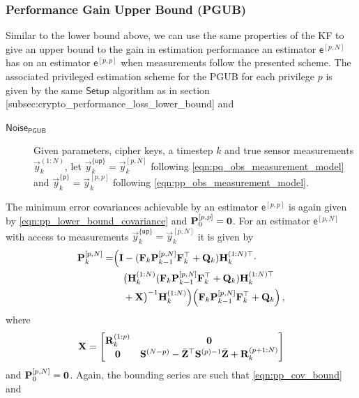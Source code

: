 \subsubsection{Performance Gain Upper Bound (PGUB)}
Similar to the lower bound above, we can use the same properties of the KF to give an upper bound to the gain in estimation performance an estimator $\mathsf{e}^{[p,N]}$ has on an estimator $\mathsf{e}^{[p,p]}$ when measurements follow the presented scheme. The associated privileged estimation scheme for the PGUB for each privilege $p$ is given by the same $\mathsf{Setup}$ algorithm as in section [subsec:crypto\_performance\_loss\_lower\_bound] and
\begin{description}
  \item[$\mathsf{Noise}_{\mathsf{PGUB}}$] Given parameters, cipher keys, a timestep $k$ and true sensor measurements $\vec{y}_k^{(1:N)}$, let $\vec{y}_k^{\{\mathsf{up}\}}=\vec{y}_k^{[p,N]}$ following \eqref{eqn:pq_obs_measurement_model} and $\vec{y}_k^{\{\mathsf{p}\}}=\vec{y}_k^{[p,p]}$ following \eqref{eqn:pp_obs_measurement_model}.
\end{description}
The minimum error covariances achievable by an estimator $\mathsf{e}^{[p,p]}$ is again given by \eqref{eqn:pp_lower_bound_covariance} and ${{\mathbf{P}}}_0^{[p,p]} = {{\mathbf{0}}}$. For an estimator $\mathsf{e}^{[p,N]}$ with access to measurements $\vec{y}_k^{\{\mathsf{up}\}}=\vec{y}_k^{[p,N]}$ it is given by
\begin{equation}\label{eqn:pN_lower_bound_covariance}
  \begin{split}
    {\ensuremath{{\mathbf{P}}}}_k^{[p,N]} =& \Bigl( {{\mathbf{I}}} - ({{\mathbf{F}}}_k{{\mathbf{P}}}_{k-1}^{[p,N]}{{\mathbf{F}}}_k^\top + {{\mathbf{Q}}}_k){{\mathbf{H}}}_k^{(1:N)\top} \cdot \\
    &\quad\bigl({{\mathbf{H}}}_k^{(1:N)}({{\mathbf{F}}}_k{{\mathbf{P}}}_{k-1}^{[p,N]}{{\mathbf{F}}}_k^\top + {{\mathbf{Q}}}_k){{\mathbf{H}}}_k^{(1:N)\top} \\
    &\quad+ {{\mathbf{X}}}\bigr)^{-1}{{\mathbf{H}}}_k^{(1:N)}\Bigr)\Bigl({{\mathbf{F}}}_k{{\mathbf{P}}}_{k-1}^{[p,N]}{{\mathbf{F}}}_k^\top + {{\mathbf{Q}}}_k\Bigr)\,,
 \end{split}
\end{equation}
where
\begin{equation}
  {\ensuremath{{\mathbf{X}}}} = 
  \begin{bmatrix}
    {\ensuremath{{\mathbf{R}}}}_k^{(1:p)} & {{\mathbf{0}}}\\
    {{\mathbf{0}}} & {{\mathbf{S}}}^{(N-p)} - \bar{{{\mathbf{Z}}}}^\top{\ensuremath{{\mathbf{S}}}}^{(p)-1}\bar{{{\mathbf{Z}}}} + {{\mathbf{R}}}_k^{(p+1:N)}
  \end{bmatrix}
\end{equation}
and ${{\mathbf{P}}}_0^{[p,N]} = {{\mathbf{0}}}$. Again, the bounding series are such that \eqref{eqn:pp_cov_bound} and
